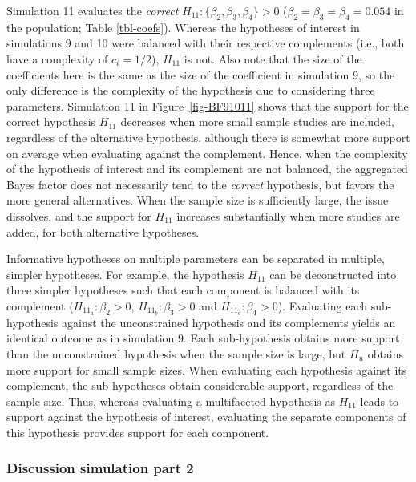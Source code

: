 \documentclass[
]{interact}
\begin{document}
Simulation 11 evaluates the \emph{correct}
\(H_{11}: \{\beta_2, \beta_3, \beta_4\} > 0\)
(\(\beta_2 = \beta_3 = \beta_4 = 0.054\) in the population; Table
\ref{tbl-coefs}). Whereas the hypotheses of interest in simulations 9
and 10 were balanced with their respective complements (i.e., both have
a complexity of \(c_i = 1/2\)), \(H_{11}\) is not. Also note that the
size of the coefficients here is the same as the size of the coefficient
in simulation 9, so the only difference is the complexity of the
hypothesis due to considering three parameters. Simulation 11 in
Figure~\ref{fig-BF91011} shows that the support for the correct
hypothesis \(H_{11}\) decreases when more small sample studies are
included, regardless of the alternative hypothesis, although there is
somewhat more support on average when evaluating against the complement.
Hence, when the complexity of the hypothesis of interest and its
complement are not balanced, the aggregated Bayes factor does not
necessarily tend to the \emph{correct} hypothesis, but favors the more
general alternatives. When the sample size is sufficiently large, the
issue dissolves, and the support for \(H_{11}\) increases substantially
when more studies are added, for both alternative hypotheses.

Informative hypotheses on multiple parameters can be separated in
multiple, simpler hypotheses. For example, the hypothesis \(H_{11}\) can
be deconstructed into three simpler hypotheses such that each component
is balanced with its complement (\(H_{11_a}: \beta_2 > 0\),
\(H_{11_b}: \beta_3 > 0\) and \(H_{11_c}: \beta_4 > 0\)). Evaluating
each sub-hypothesis against the unconstrained hypothesis and its
complements yields an identical outcome as in simulation 9. Each
sub-hypothesis obtains more support than the unconstrained hypothesis
when the sample size is large, but \(H_u\) obtains more support for
small sample sizes. When evaluating each hypothesis against its
complement, the sub-hypotheses obtain considerable support, regardless
of the sample size. Thus, whereas evaluating a multifaceted hypothesis
as \(H_{11}\) leads to support against the hypothesis of interest,
evaluating the separate components of this hypothesis provides support
for each component.

\hypertarget{discussion-simulation-part-2}{%
\subsubsection{Discussion simulation part
2}\label{discussion-simulation-part-2}}
\end{document}
